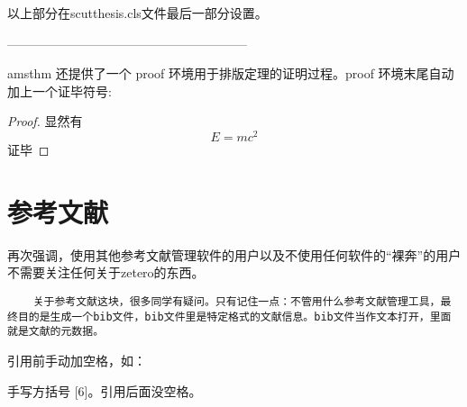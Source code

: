 以上部分在scutthesis.cls文件最后一部分设置。

---------------------------------------------------------

amsthm 还提供了一个 proof 环境用于排版定理的证明过程。proof 环境末尾自动加上一个证毕符号:
\begin{proof}
	显然有
	\[
		E=mc^2
	\]
	证毕
\end{proof}



\section{参考文献}

再次强调，使用其他参考文献管理软件的用户以及不使用任何软件的“裸奔”的用户不需要关注任何关于zetero的东西。
\begin{lstlisting}
	关于参考文献这块，很多同学有疑问。只有记住一点：不管用什么参考文献管理工具，最终目的是生成一个bib文件，bib文件里是特定格式的文献信息。bib文件当作文本打开，里面就是文献的元数据。
\end{lstlisting}


引用前手动加空格，如：


手写方括号 [6]。引用后面没空格。












